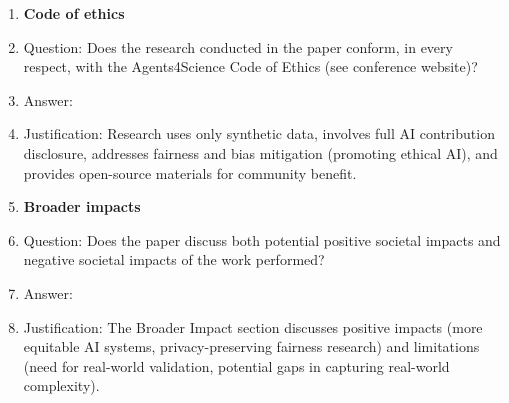 \documentclass{article}
\begin{document}
\begin{enumerate}
\item {\bf Code of ethics}
    \item[] Question: Does the research conducted in the paper conform, in every respect, with the Agents4Science Code of Ethics (see conference website)?
    \item[] Answer: \answerYes{}
    \item[] Justification: Research uses only synthetic data, involves full AI contribution disclosure, addresses fairness and bias mitigation (promoting ethical AI), and provides open-source materials for community benefit.

\item {\bf Broader impacts}
    \item[] Question: Does the paper discuss both potential positive societal impacts and negative societal impacts of the work performed?
    \item[] Answer: \answerYes{}
    \item[] Justification: The Broader Impact section discusses positive impacts (more equitable AI systems, privacy-preserving fairness research) and limitations (need for real-world validation, potential gaps in capturing real-world complexity).

\end{enumerate}
\end{document}
